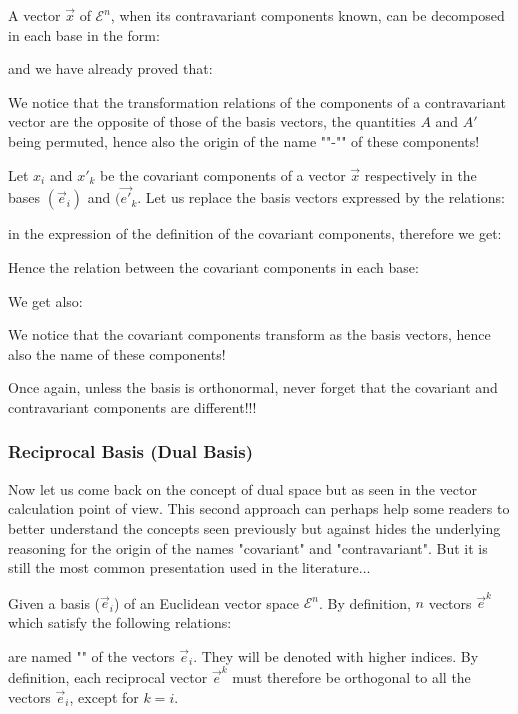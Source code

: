 	A vector $\vec{x}$ of $\mathcal{E}^n$, when its contravariant components known, can be decomposed in each base in the form:
	
	and we have already proved that:
	
	We notice that the transformation relations of the components of a contravariant vector are the opposite of those of the basis vectors, the quantities $A$ and $A '$ being permuted, hence also the origin of the name ""-"" of these components!

	Let $x_i$ and ${x'}_k$ be the covariant components of a vector $\vec{x}$ respectively in the bases $(\vec{e}_i)$ and $(\vec{e'}_k$. Let us replace the basis vectors expressed by the relations:
	
	in the expression of the definition of the covariant components, therefore we get:
	
	Hence the relation between the covariant components in each base:
	
	We get also:
	
	We notice that the covariant components transform as the basis vectors, hence also the name of these components!
	
	Once again, unless the basis is orthonormal, never forget that the covariant and contravariant components are different!!!
	
	\subsubsection{Reciprocal Basis (Dual Basis)}
	Now let us come back on the concept of dual space but as seen in the vector calculation point of view. This second approach can perhaps help some readers to better understand the concepts seen previously but against hides the underlying reasoning for the origin of the names "covariant" and "contravariant". But it is still the most common presentation used in the literature...
	
	Given a basis ($\vec{e}_i$) of an Euclidean vector space $\mathcal{E}^n$. By definition, $n$ vectors $\vec{e}^k$ which satisfy the following relations:
	
	are named "" of the vectors $\vec{e}_i$. They will be denoted with higher indices. By definition, each reciprocal vector $\vec{e}^k$ must therefore be orthogonal to all the vectors $\vec{e}_i$, except for $k=i$.
	
